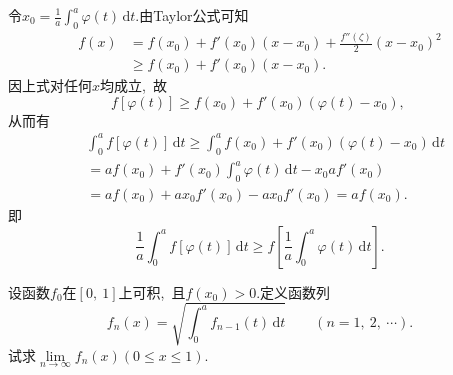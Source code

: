 	\begin{solution}
		令$x_0=\frac{1}{a}\int_{0}^{a}\varphi(t)\,\text{d}t.$由Taylor公式可知
		\begin{align*}
			f(x)&=f(x_0)+f'(x_0)(x-x_0)+\frac{f''(\zeta)}{2}(x-x_0)^2\\
			&\ge f(x_0)+f'(x_0)(x-x_0).
		\end{align*}
		因上式对任何$x$均成立,\ 故
		$$f\left[\varphi\left(t\right)\right]\ge f(x_0)+f'(x_0)\left(\varphi(t)-x_0\right),\ $$
		从而有
		\begin{align*}
			&\int_{0}^{a}f\left[\varphi\left(t\right)\right]\,\text{d}t\ge \int_{0}^{a}f(x_0)+f'(x_0)\left(\varphi(t)-x_0\right)\,\text{d}t\\
			&=af(x_0)+f'(x_0)\int_{0}^{a}\varphi(t)\,\text{d}t-x_0af'(x_0)\\
			&=af(x_0)+ax_0f'(x_0)-ax_0f'(x_0)=af(x_0).
		\end{align*}
		即
		$$\frac{1}{a}\int_{0}^{a}f\left[\varphi\left(t\right)\right]\,\text{d}t\ge f\left[\frac{1}{a}\int_{0}^{a}\varphi\left(t\right)\,\text{d}t\right].$$ 
	\end{solution}
	\newpage
	\begin{problem}
		设函数$f_0$在$\left[0,\ 1\right]$上可积,\ 且$f(x_0)>0.$定义函数列
		$$f_n(x)=\sqrt{\int_{0}^{a}f_{n-1}(t)\,\text{d}t}\qquad(n=1,\ 2,\ \cdots).$$
		试求$\lim\limits_{n\rightarrow\infty}f_n(x)(0\le x\le 1).$
	\end{problem}
	
